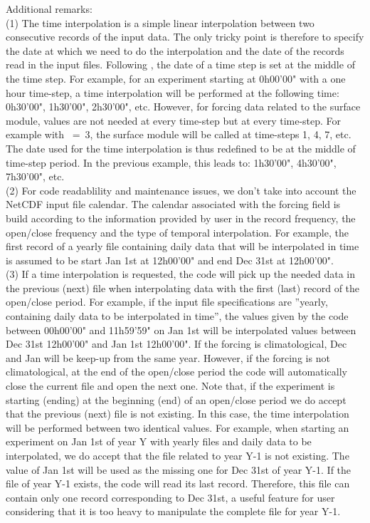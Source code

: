 \documentclass[NEMO_book]{subfiles}
\begin{document}
Additional remarks:\\
(1) The time interpolation is a simple linear interpolation between two consecutive records of 
the input data. The only tricky point is therefore to specify the date at which we need to do 
the interpolation and the date of the records read in the input files. 
Following \citet{Leclair_Madec_OM09}, the date of a time step is set at the middle of the 
time step. For example, for an experiment starting at 0h00'00" with a one hour time-step, 
a time interpolation will be performed at the following time: 0h30'00", 1h30'00", 2h30'00", etc.
However, for forcing data related to the surface module, values are not needed at every 
time-step but at every  time-step. For example with ~=~3, 
the surface module will be called at time-steps 1, 4, 7, etc. The date used for the time interpolation 
is thus redefined to be at the middle of  time-step period. In the previous example, 
this leads to: 1h30'00", 4h30'00", 7h30'00", etc. \\ 
(2) For code readablility and maintenance issues, we don't take into account the NetCDF input file 
calendar. The calendar associated with the forcing field is build according to the information 
provided by user in the record frequency, the open/close frequency and the type of temporal interpolation. 
For example, the first record of a yearly file containing daily data that will be interpolated in time 
is assumed to be start Jan 1st at 12h00'00" and end Dec 31st at 12h00'00". \\
(3) If a time interpolation is requested, the code will pick up the needed data in the previous (next) file 
when interpolating data with the first (last) record of the open/close period. 
For example, if the input file specifications are ''yearly, containing daily data to be interpolated in time'', 
the values given by the code between 00h00'00" and 11h59'59" on Jan 1st will be interpolated values 
between Dec 31st 12h00'00" and Jan 1st 12h00'00". If the forcing is climatological, Dec and Jan will 
be keep-up from the same year. However, if the forcing is not climatological, at the end of the 
open/close period the code will automatically close the current file and open the next one. 
Note that, if the experiment is starting (ending) at the beginning (end) of an open/close period 
we do accept that the previous (next) file is not existing. In this case, the time interpolation 
will be performed between two identical values. For example, when starting an experiment on 
Jan 1st of year Y with yearly files and daily data to be interpolated, we do accept that the file 
related to year Y-1 is not existing. The value of Jan 1st will be used as the missing one for 
Dec 31st of year Y-1. If the file of year Y-1 exists, the code will read its last record. 
Therefore, this file can contain only one record corresponding to Dec 31st, a useful feature for 
user considering that it is too heavy to manipulate the complete file for year Y-1.
\end{document}

